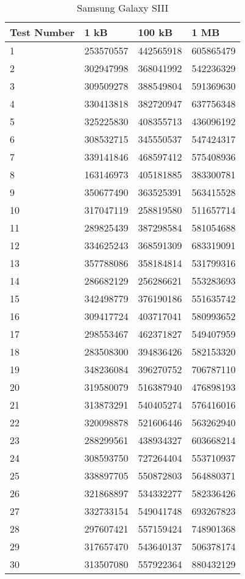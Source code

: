 	\begin{table}[ht!]
    		\caption{Samsung Galaxy SIII} \label{tab:distamceGoogleGlassFull}
		\centering \begin{tabularx}{\textwidth}{l|X|X|X} \hline
		Test Number & \textbf{1 kB} & \textbf{100 kB} & \textbf{1 MB} \\ \hline \hline
		
		1&	253570557	&	442565918	&	605865479	\\ \hline
		2&	302947998	&	368041992	&	542236329	\\ \hline
		3&	309509278	&	388549804	&	591369630	\\ \hline
		4&	330413818	&	382720947	&	637756348	\\ \hline
		5&	325225830	&	408355713	&	436096192	\\ \hline
		6&	308532715	&	345550537	&	547424317	\\ \hline
		7&	339141846	&	468597412	&	575408936	\\ \hline
		8&	163146973	&	405181885	&	383300781	\\ \hline
		9&	350677490	&	363525391	&	563415528	\\ \hline
		10&	317047119	&	258819580	&	511657714	\\ \hline
		11&	289825439	&	387298584	&	581054688	\\ \hline
		12&	334625243	&	368591309	&	683319091	\\ \hline
		13&	357788086	&	358184814	&	531799316	\\ \hline
		14&	286682129	&	256286621	&	553283693	\\ \hline
		15&	342498779	&	376190186	&	551635742	\\ \hline
		16&	309417724	&	403717041	&	580993652	\\ \hline
		17&	298553467	&	462371827	&	549407959	\\ \hline
		18&	283508300	&	394836426	&	582153320	\\ \hline
		19&	348236084	&	396270752	&	706787110	\\ \hline
		20&	319580079	&	516387940	&	476898193	\\ \hline
		21&	313873291	&	540405274	&	576416016	\\ \hline
		22&	320098878	&	521606446	&	563262940	\\ \hline
		23&	288299561	&	438934327	&	603668214	\\ \hline
		24&	308593750	&	727264404	&	553710937	\\ \hline
		25&	338897705	&	550872803	&	564880371	\\ \hline
		26&	321868897	&	534332277	&	582336426	\\ \hline
		27&	332733154	&	549041748	&	693267823	\\ \hline
		28&	297607421	&	557159424	&	748901368	\\ \hline
		29&	317657470	&	543640137	&	506378174	\\ \hline
		30&	313507080	&	557922364	&	880432129	\\ \hline
		
		\end{tabularx}
	\end{table}